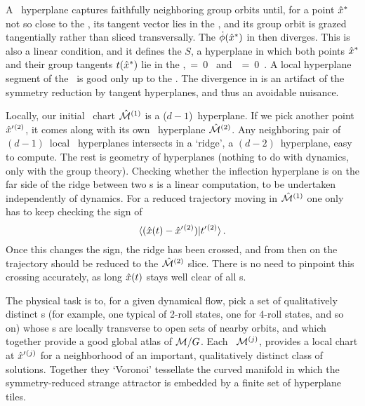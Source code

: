 A \slice\ hyperplane captures faithfully neighboring group orbits until,
for a point $\hat{x}^\ast$ not so close to the \template, its tangent vector
lies in the \slice,
and its group orbit is grazed tangentially rather than sliced
transversally. The {\phaseVel} $\dot{{\bf \phi}}(\hat{x}^\ast)$ in
 then diverges. This is also a linear condition, and it
defines the {\sliceBord} $S$, a hyperplane in which both points
$\hat{x}^\ast$ and their group tangents $t(\hat{x}^\ast)$ lie in the
{\slice},
\beq
\braket{\sspRSing}{\sliceTan{}} \,=\, 0
      \mbox{ and }
\braket{\groupTan(\sspRSing)}{\sliceTan{}} \,=\, 0
\,.
\label{sliceSingl0}
\eeq
A local hyperplane segment of the \slice\ is good only up to the \sliceBord. The
divergence in {\phaseVel}  is an artifact of the
symmetry reduction by tangent hyperplanes, and thus an avoidable
nuisance.

Locally, our initial \slice\ chart $\hat{\cal M}{}^{(1)}$ is a ($d\!-\!1$)\dmn\
hyperplane. If we pick another {\template} point ${\hat{x}'}{}^{(2)}$, it
comes along with its own \slice\ hyperplane $\hat{\cal M}{}^{(2)}$. Any
neighboring pair of $(d\!-\!1)$\dmn\ local \slice\ hyperplanes intersects
in a `ridge',
a $(d\!-\!2)$\dmn\ hyperplane, easy to compute.
The rest is geometry of hyperplanes (nothing
to do with dynamics, only with the group theory). Checking whether the
inflection hyperplane is on the far side of the ridge between two \slice
s is a linear computation, to be undertaken independently of dynamics.
For a reduced trajectory moving in $\hat{\cal M}{}^{(1)}$ one only has to keep checking
the sign of
\[
\braket{(\sspRed(\zeit)- \slicep{}^{(2)})}{\sliceTan{}{}^{(2)}}
\,.
\]
Once this changes the sign, the ridge has been crossed, and from then on the
trajectory should be reduced to the $\hat{\cal M}{}^{(2)}$ slice. There is no need to
pinpoint this crossing accurately, as long $\hat{x}(t)$ stays well clear of
all \chartBord s.

The physical task is to, for a given dynamical flow, pick a set of
qualitatively distinct {\template s} (for example, one typical of 2-roll
states, one for 4-roll states, and so on) whose \slice s  are locally
transverse to open sets of nearby orbits, and which together provide a
good global atlas of ${\cal M}/G$. Each \slice\ ${\cal M}{}^{(j)}$, provides a
local chart at ${\hat{x}'}{}^{(j)}$ for a neighborhood of an important,
qualitatively distinct class of solutions. Together they `Voronoi'
tessellate  the curved manifold in which the symmetry-reduced strange
attractor is embedded by a finite set of hyperplane tiles.

